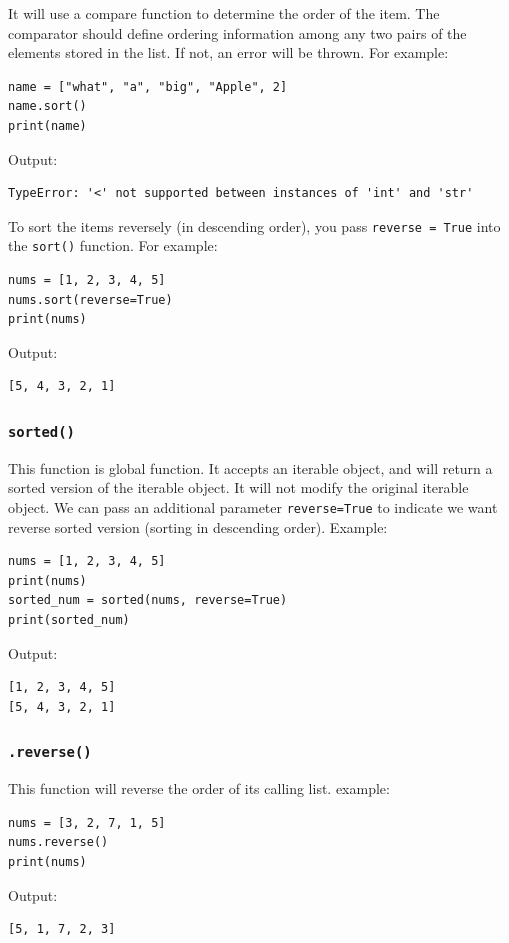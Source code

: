 \documentclass[12pt]{book}
\begin{document}
It will use a compare function to determine the order of the item. The comparator should define ordering information among any two pairs of the elements stored in the list. If not, an error will be thrown. For example:
\begin{verbatim}
name = ["what", "a", "big", "Apple", 2]
name.sort()
print(name)
\end{verbatim}
Output:
\begin{verbatim}
TypeError: '<' not supported between instances of 'int' and 'str'
\end{verbatim}

To sort the items reversely (in descending order), you pass \texttt{reverse = True} into the \texttt{sort()} function. For example:
\begin{verbatim}
nums = [1, 2, 3, 4, 5]
nums.sort(reverse=True)
print(nums)
\end{verbatim}
Output:
\begin{verbatim}
[5, 4, 3, 2, 1]
\end{verbatim}
\subsubsection{\texttt{sorted()}}
\label{sec:org4b4944c}
This function is global function. It accepts an iterable object, and will return a sorted version of the iterable object. It will not modify the original iterable object. We can pass an additional parameter \texttt{reverse=True} to indicate we want reverse sorted version (sorting in descending order). Example:
\begin{verbatim}
nums = [1, 2, 3, 4, 5]
print(nums)
sorted_num = sorted(nums, reverse=True)
print(sorted_num)
\end{verbatim}
Output:
\begin{verbatim}
[1, 2, 3, 4, 5]
[5, 4, 3, 2, 1]
\end{verbatim}
\subsubsection{\texttt{.reverse()}}
\label{sec:org9d41e71}
This function will reverse the order of its calling list. example:
\begin{verbatim}
nums = [3, 2, 7, 1, 5]
nums.reverse()
print(nums)
\end{verbatim}
Output:
\begin{verbatim}
[5, 1, 7, 2, 3]
\end{verbatim}
\end{document}
